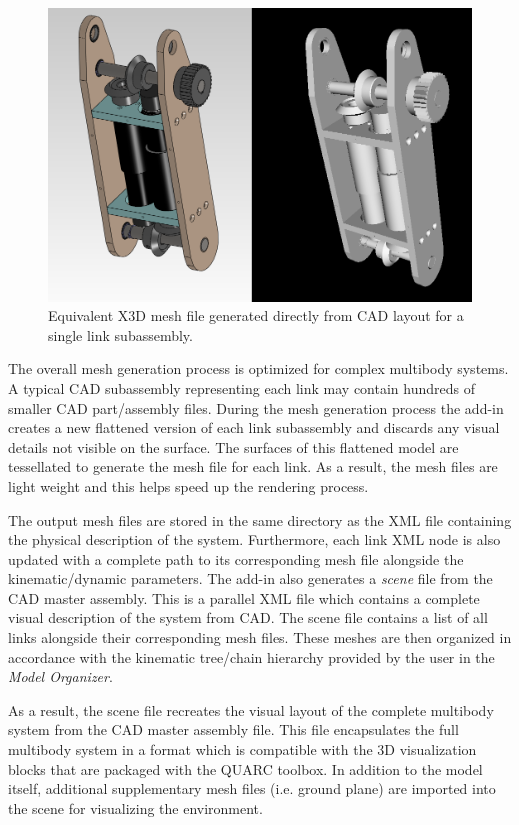\begin{figure}[!h]
	\centering
    \includegraphics[scale=0.5]{fig/toolchain/cad2x3d.png}
  	\caption{Equivalent X3D mesh file generated directly from CAD layout for a single link subassembly.}
	\label{fig:visualcom}
\end{figure}

The overall mesh generation process is optimized for complex multibody systems. A typical CAD subassembly representing each link may contain hundreds of smaller CAD part/assembly files. During the mesh generation process the add-in creates a new flattened version of each link subassembly and discards any visual details not visible on the surface. The surfaces of this flattened model are tessellated to generate the mesh file for each link. As a result, the mesh files are light weight and this helps speed up the rendering process.

The output mesh files are stored in the same directory as the XML file containing the physical description of the system. Furthermore, each link XML node is also updated with a complete path to its corresponding mesh file alongside the kinematic/dynamic parameters. The add-in also generates a \emph{scene} file from the CAD master assembly. This is a parallel XML file which contains a complete visual description of the system from CAD. The scene file contains a list of all links alongside their corresponding mesh files. These meshes are then organized in accordance with the kinematic tree/chain hierarchy provided by the user in the \emph{Model Organizer}.

As a result, the scene file recreates the visual layout of the complete multibody system from the CAD master assembly file. This file encapsulates the full multibody system in a format which is compatible with the 3D visualization blocks that are packaged with the QUARC toolbox. In addition to the model itself, additional supplementary mesh files (i.e. ground plane) are imported into the scene for visualizing the environment.

